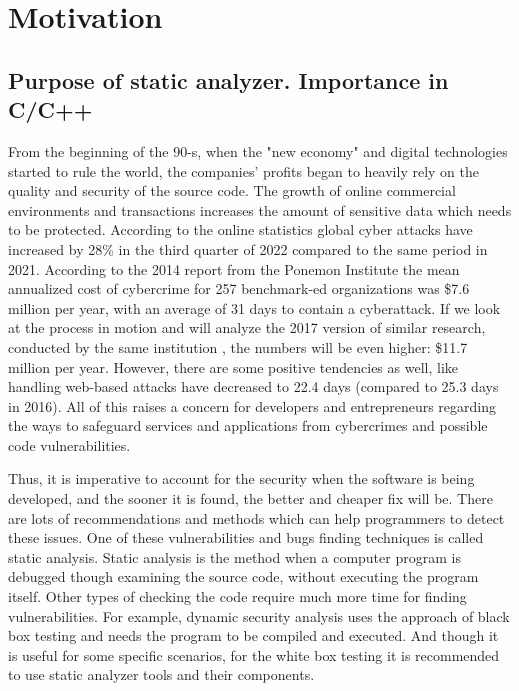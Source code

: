 \section{Motivation}
\subsection{Purpose of static analyzer. Importance in C/C++}

From the beginning of the 90-s, when the "new economy" \cite{new-economy} and digital technologies started to rule the world, the companies' profits began to heavily rely on the quality and security of the source code. The growth of online commercial environments and transactions increases the amount of sensitive data which needs to be protected. According to the online statistics \cite{cybercrimes-statistics} global cyber attacks have increased by 28\% in the third quarter of 2022 compared to the same period in 2021. According to the 2014 \cite{cybercrimes-ponemon-2014} report from the Ponemon Institute the mean annualized cost of cybercrime for 257 benchmark-ed organizations was \$7.6 million per year, with an average of 31 days to contain a cyberattack. If we look at the process in motion and will analyze the 2017 version of similar research, conducted by the same institution \cite{cybercrimes-ponemon-2017}, the numbers will be even higher: \$11.7 million per year. However, there are some positive tendencies as well, like handling web-based attacks have decreased to 22.4 days (compared to 25.3 days in 2016). All of this raises a concern for developers and entrepreneurs regarding the ways to safeguard services and applications from cybercrimes and possible code vulnerabilities. 

Thus, it is imperative to account for the security when the software is being developed, and the sooner it is found, the better and cheaper fix will be. There are lots of recommendations and methods which can help programmers to detect these issues. One of these vulnerabilities and bugs finding techniques is called static analysis. Static analysis is the method when a computer program is debugged though examining the source code, without executing the program itself. Other types of checking the code require much more time for finding vulnerabilities. For example, dynamic security analysis uses the approach of black box testing and needs the program to be compiled and executed. And though it is useful for some specific scenarios, for the white box testing it is recommended to use static analyzer tools and their components. 

